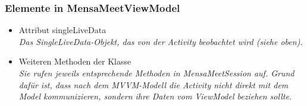 \documentclass[a4paper]{scrreprt}
\begin{document}
\subsubsection{Elemente in MensaMeetViewModel}
\begin{itemize}
\item Attribut singleLiveData\\
\textit{Das SingleLiveData-Objekt, das von der Activity beobachtet wird (siehe oben).}
\item Weiteren Methoden der Klasse \\
\textit{Sie rufen jeweils entsprechende Methoden in MensaMeetSession auf. Grund dafür ist, dass nach dem MVVM-Modell die Activity nicht direkt mit dem Model kommunizieren, sondern ihre Daten vom ViewModel beziehen sollte.}
\end{itemize}
\end{document}
